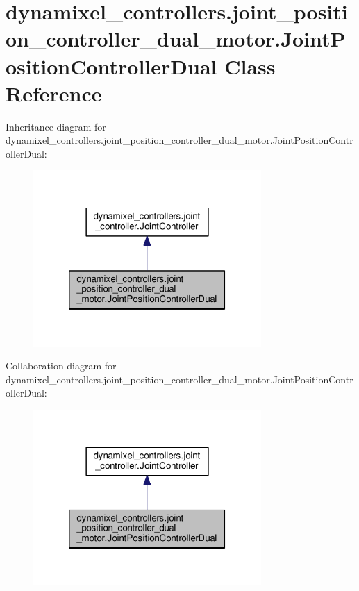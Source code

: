 \hypertarget{classdynamixel__controllers_1_1joint__position__controller__dual__motor_1_1_joint_position_controller_dual}{}\section{dynamixel\+\_\+controllers.\+joint\+\_\+position\+\_\+controller\+\_\+dual\+\_\+motor.\+Joint\+Position\+Controller\+Dual Class Reference}
\label{classdynamixel__controllers_1_1joint__position__controller__dual__motor_1_1_joint_position_controller_dual}


Inheritance diagram for dynamixel\+\_\+controllers.\+joint\+\_\+position\+\_\+controller\+\_\+dual\+\_\+motor.\+Joint\+Position\+Controller\+Dual\+:
\nopagebreak
\begin{figure}[H]
\begin{center}
\leavevmode
\includegraphics[width=246pt]{d7/dfb/classdynamixel__controllers_1_1joint__position__controller__dual__motor_1_1_joint_position_controller_dual__inherit__graph}
\end{center}
\end{figure}


Collaboration diagram for dynamixel\+\_\+controllers.\+joint\+\_\+position\+\_\+controller\+\_\+dual\+\_\+motor.\+Joint\+Position\+Controller\+Dual\+:
\nopagebreak
\begin{figure}[H]
\begin{center}
\leavevmode
\includegraphics[width=246pt]{dc/d76/classdynamixel__controllers_1_1joint__position__controller__dual__motor_1_1_joint_position_controller_dual__coll__graph}
\end{center}
\end{figure}
